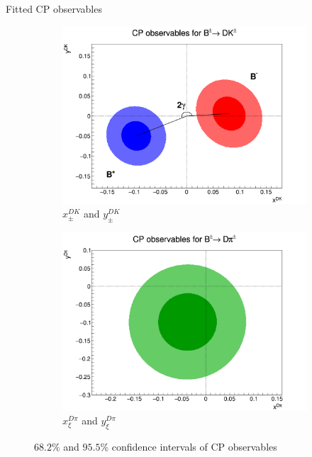 \documentclass{beamer}
\begin{document}
\begin{frame}{Fitted CP observables}
  \begin{figure}
    \centering
    \vspace{-0.2cm}
    \begin{subfigure}{0.5\textwidth}
      \includegraphics[width = 1.0\textwidth]{Plots/CPContours.png}
      \caption{$x_\pm^{DK}$ and $y_\pm^{DK}$}
    \end{subfigure}%
    \begin{subfigure}{0.5\textwidth}
      \includegraphics[width = 1.0\textwidth]{Plots/CPXiContours.png}
      \caption{$x_\xi^{D\pi}$ and $y_\xi^{D\pi}$}
    \end{subfigure}
    \caption{$68.2\%$ and $95.5\%$ confidence intervals of CP observables}
  \end{figure}
\end{frame}
\end{document}
